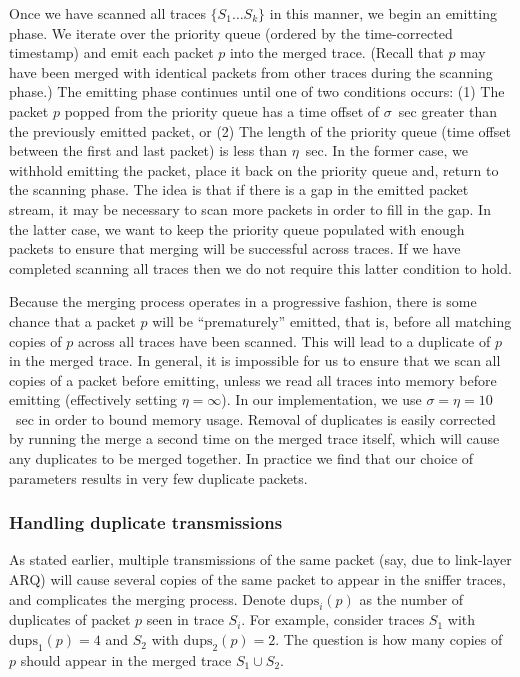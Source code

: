 Once we have scanned all traces $\{S_1 \ldots S_k\}$ in this
manner, we begin an emitting phase. We iterate over the priority
queue (ordered by the time-corrected timestamp) and emit each packet
$p$ into the merged trace. (Recall that $p$ may have been merged with 
identical packets from other traces during the scanning phase.) The
emitting phase continues until one of two conditions occurs: (1) The
packet $p$ popped from the priority queue has a time offset of 
$\sigma$~sec greater than the previously emitted packet, or (2) The
length of the priority queue (time offset between the first and last
packet) is less than $\eta$~sec. In the former case, we
withhold emitting the packet, place it back on the priority queue
and, return to the scanning phase. The idea is that if there is a
gap in the emitted packet stream, it may be necessary to scan more
packets in order to fill in the gap. In the latter case, we want to
keep the priority queue populated with enough packets to ensure that
merging will be successful across traces. 
If we have completed scanning all traces then we do not require this
latter condition to hold. 

Because the merging process operates in a progressive fashion, there
is some chance that a packet $p$ will be ``prematurely'' emitted, that
is, before all matching copies of $p$ across all traces have been
scanned. This will lead to a duplicate of $p$ in the merged trace. 
In general, it is impossible for us to ensure that we scan
all copies of a packet before emitting, unless we read all traces
into memory before emitting (effectively setting $\eta = \infty$).
In our implementation, we use $\sigma = \eta = 10$~sec in order to
bound memory usage. 
Removal of duplicates is easily corrected by running the merge 
a second time on the merged trace itself, which will cause 
any duplicates to be merged together.
In practice we find that our choice of parameters results in very few
duplicate packets.


\subsubsection{Handling duplicate transmissions} 

As stated earlier, multiple
transmissions of the same packet (say, due to link-layer ARQ) will
cause several copies of the same packet to appear in the sniffer
traces, and complicates the merging process. Denote
$\mathrm{dups}_i(p)$ as the number of duplicates of packet $p$ seen
in trace $S_i$. For example, consider traces $S_1$ with 
$\mathrm{dups}_1(p) = 4$ and $S_2$ with $\mathrm{dups}_2(p) = 2$.
The question is how many copies of $p$ should appear in the merged
trace $S_1 \cup S_2$.

